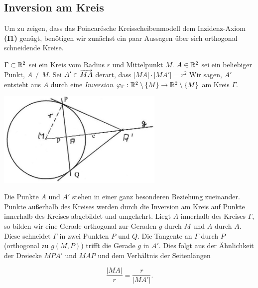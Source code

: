 \subsection*{Inversion am Kreis}

Um zu zeigen, dass das Poincarésche Kreisscheibenmodell dem Inzidenz-Axiom {\bf (I1)} genügt,
benötigen wir zunächst ein paar Aussagen über sich orthogonal schneidende Kreise.


\begin{defi}
    $\Gamma \subset \mathbb R^2$ sei ein Kreis vom Radius $r$ und Mittelpunkt $M$. $A \in \mathbb R^2$ sei ein
    beliebiger Punkt, $A \neq M$. Sei $A' \in \mbox{${\overrightarrow{MA}}$}$ derart, dass $|MA| \cdot |MA'| = r^2$
    Wir sagen, $A'$ entsteht aus $A$ durch eine \emph{Inversion} $\varphi_\Gamma :
    \mathbb R^2 \setminus\{M\} \to \mathbb R^2 \setminus \{M\}$ am Kreis $\Gamma$.
\end{defi}

\centerline{\includegraphics[width=8cm]{BILDER/4-2-01-Inversion.jpg}}

Die Punkte $A$ und $A'$ stehen in einer ganz besonderen Beziehung zueinander. Punkte außerhalb des
Kreises werden durch die Inversion am Kreis auf Punkte innerhalb des Kreises abgebildet und
umgekehrt. Liegt $A$ innerhalb des Kreises $\Gamma$, so bilden wir eine Gerade orthogonal zur
Geraden $g$ durch $M$ und $A$ durch $A$. Diese schneidet $\Gamma$ in zwei Punkten $P$ und $Q$. Die
Tangente an $\Gamma$ durch $P$ (orthogonal zu $g(M,P)$) trifft die Gerade $g$ in $A'$. Dies folgt
aus der Ähnlichkeit der Dreiecke $MPA'$ und $MAP$ und dem Verhältnis der Seitenlängen

$$
    \frac{|MA|}{r} = \frac{r}{|MA'|}.
$$

